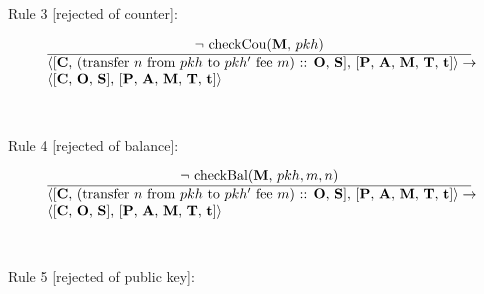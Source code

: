 \documentclass[a4paper]{llncs}
\begin{document}
\begin{mathpar}
\end{mathpar}
~\\
~\\
Rule 3 [rejected of counter]:

\begin{equation}{}
\frac{\text{$\neg$ checkCou(\MANAGERS, $pkh$)}}{\parbox{4.2in}{\text{$\langle$[\ACCOUNTS, (transfer $n$ from $pkh$ to $pkh'$ fee $m$) :: \OPERATIONS, \CONTRACTS], [\PENDING, \ACCEPTED, \MANAGERS, \CONTRACTORS, \TIME]$\rangle \rightarrow$ }\\
\text{$\langle$[\ACCOUNTS, \OPERATIONS, \CONTRACTS], [\PENDING, \ACCEPTED, \MANAGERS, \CONTRACTORS, \TIME]$\rangle$}}} 
\end{equation}
~\\
~\\
Rule 4 [rejected of balance]:

\begin{equation}{}
\frac{\text{$\neg$ checkBal(\MANAGERS, $pkh, m, n$)}}{\parbox{4.2in}{\text{$\langle$[\ACCOUNTS, (transfer $n$ from $pkh$ to $pkh'$ fee $m$) :: \OPERATIONS, \CONTRACTS], [\PENDING, \ACCEPTED, \MANAGERS, \CONTRACTORS, \TIME]$\rangle \rightarrow$ }\\
\text{$\langle$[\ACCOUNTS, \OPERATIONS, \CONTRACTS], [\PENDING, \ACCEPTED, \MANAGERS, \CONTRACTORS, \TIME]$\rangle$}}} 
\end{equation}
~\\
~\\
Rule 5 [rejected of public key]:
\end{document}
